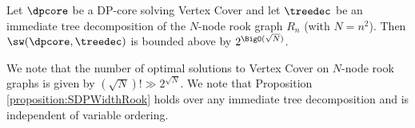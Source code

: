 \begin{proposition}
\label{proposition:SDPWidthRook}
Let $\dpcore$ be a DP-core solving {\sc Vertex Cover} and let $\treedec$ be an immediate tree decomposition of the $N$-node rook graph $R_n$ (with $N = n^2$). Then $\sw(\dpcore, \treedec)$ is bounded above by $2^{\BigO(\sqrt{N})}$.
\end{proposition}

We note that the number of optimal solutions to {\sc Vertex Cover} on $N$-node rook graphs is given by $(\sqrt{N})! \gg 2^{\sqrt{N}}$. We note that Proposition \ref{proposition:SDPWidthRook} holds over any immediate tree decomposition and is independent of variable ordering.



















